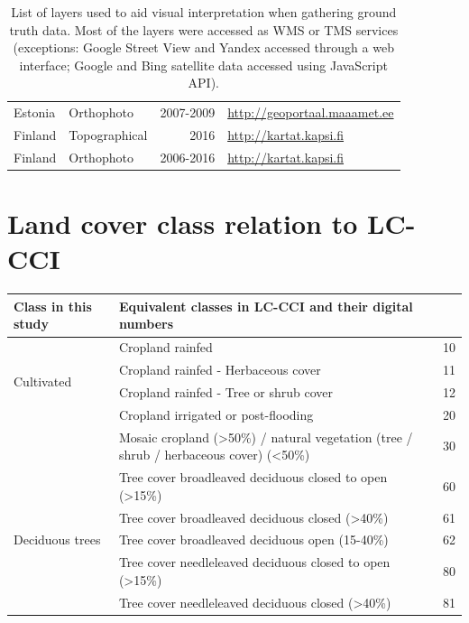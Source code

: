 \documentclass[a4paper,12pt]{scrbook}
\begin{document}
\begin{appendices}
\begin{table}[!ht]
\begin{center}
\begin{tabular}{llrl}
	Estonia & Orthophoto & 2007-2009 & \url{http://geoportaal.maaamet.ee} \\
	Finland & Topographical & 2016 & \url{http://kartat.kapsi.fi} \\
	Finland & Orthophoto & 2006-2016 & \url{http://kartat.kapsi.fi} \\
	\hline
      \end{tabular}
  \end{center}
  \caption{List of layers used to aid visual interpretation when gathering ground truth data. Most of the layers were accessed as WMS or TMS services (exceptions: Google Street View and Yandex accessed through a web interface; Google and Bing satellite data accessed using JavaScript API).}
  \label{tbl-layers}
 \end{table}
 
 \chapter{Land cover class relation to LC-CCI}
 \label{appendix-classes}
 \begin{table}[!ht]
  \begin{center}
    \begin{adjustbox}{totalheight=\baselineskip}
      \begin{tabular}{lp{10.5cm}l}
	\hline
	Class in this study & Equivalent classes in LC-CCI and their digital numbers & \\
	\hline
	\multirow{4}{*}{Cultivated} & Cropland rainfed & 10 \\
	  & Cropland rainfed - Herbaceous cover & 11 \\
	  & Cropland rainfed - Tree or shrub cover & 12 \\
	  & Cropland irrigated or post-flooding & 20 \\
	  & Mosaic cropland (>50\%) / natural vegetation (tree / shrub / herbaceous cover) (<50\%) & 30 \\
	\hline
	\multirow{7}{*}{Deciduous trees} & Tree cover  broadleaved  deciduous  closed to open (>15\%) & 60 \\
	  & Tree cover  broadleaved  deciduous  closed (>40\%) & 61 \\
	  & Tree cover  broadleaved  deciduous  open (15-40\%) & 62 \\
	  & Tree cover  needleleaved  deciduous  closed to open (>15\%) & 80 \\
	  & Tree cover  needleleaved  deciduous  closed (>40\%) & 81 \\

\end{tabular}
\end{adjustbox}
\end{center}
\end{table}
\end{appendices}
\end{document}
